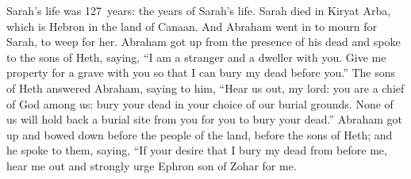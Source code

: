 
\begin{inparaenum}
     Sarah's life was 127~years: the years of Sarah's life.%
     Sarah died in Kiryat Arba, which is Hebron in the land of Canaan. And Abraham went in to mourn for Sarah, to weep for her.%
     Abraham got up from the presence of his dead and spoke to the sons of Heth, saying,%
     ``I am a stranger and a dweller with you. Give me property for a grave with you so that I can bury my dead before you.''%
     The sons of Heth answered Abraham, saying to him,%
     ``Hear us out, my lord: you are a chief of God among us: bury your dead in your choice of our burial grounds. None of us will hold back a burial site from you for you to bury your dead.''%
     Abraham got up and bowed down before the people of the land, before the sons of Heth;%
     and he spoke to them, saying, ``If your desire that I bury my dead from before me, hear me out and strongly urge Ephron son of Zohar for me.%
\end{inparaenum}
